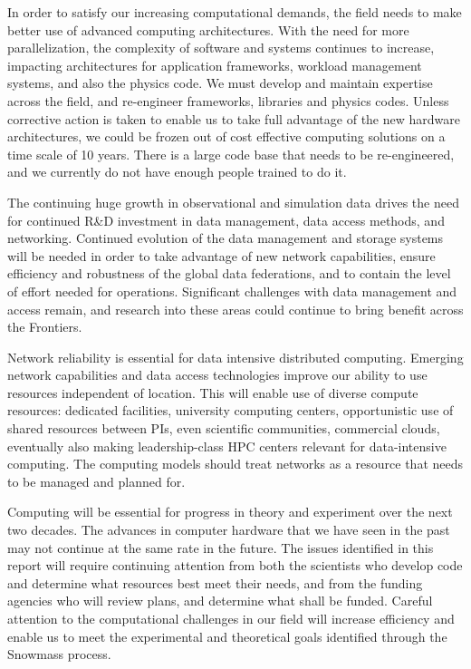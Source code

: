 In order to satisfy our increasing computational demands, the field needs
to make better use of advanced computing architectures. With the need for
more parallelization, the complexity of software and systems continues to
increase, impacting architectures for application frameworks, workload
management systems, and also the physics code. We must develop and maintain
expertise across the field, and re-engineer frameworks, libraries and
physics codes. Unless corrective action is taken to enable us to take full
advantage of the new hardware architectures, we could be frozen out of cost
effective computing solutions on a time scale of 10 years. There is a large
code base that needs to be re-engineered, and we currently do not have
enough people trained to do it.

The continuing huge growth in observational and simulation data drives the
need for continued R\&D investment in data management, data access methods,
and networking. Continued evolution of the data management and storage
systems will be needed in order to take advantage of new network
capabilities, ensure efficiency and robustness of the global data
federations, and to contain the level of effort needed for operations.
Significant challenges with data management and access remain, and research
into these areas could continue to bring benefit across the Frontiers.  

Network reliability is essential for data intensive distributed computing.
Emerging network capabilities and data access technologies improve our
ability to use resources independent of location. This will enable use of
diverse compute resources: dedicated facilities, university computing
centers, opportunistic use of shared resources between PIs, even scientific
communities, commercial clouds, eventually also making leadership-class HPC
centers relevant for data-intensive computing. The computing models should
treat networks as a resource that needs to be managed and planned for.

Computing will be essential for progress in theory and experiment over the
next two decades. 
The advances in computer hardware that we have seen
in the past may not continue at the same rate in the future. The issues
identified in this report will require continuing attention from both the
scientists who develop code and determine what resources best meet
their needs, and from the funding agencies who will review plans, and
determine what shall be funded.
Careful attention to the computational challenges in our field
will increase efficiency and enable us to meet the
experimental and theoretical goals identified through the Snowmass process.
